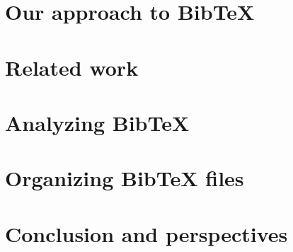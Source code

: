 \documentclass[twoside,11pt,openright,a4paper]{report}
\newcommand{\bibtex}{Bib{\TeX}}
\begin{document}
\chapter{Our approach to {\bibtex}}
\label{ch:approach}


\chapter{Related work}
\label{ch:related}


\chapter{Analyzing {\bibtex}}
\label{ch:analyzing}


\chapter{Organizing {\bibtex} files}

\chapter{Conclusion and perspectives}
\label{ch:conclusion}

\printbibliography{}
\end{document}
